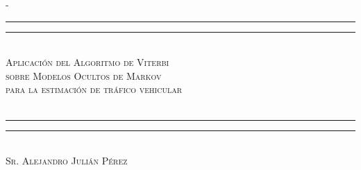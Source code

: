 %
%
% 
%
%
\begin{titlingpage}
\begin{SingleSpace}
\calccentering{\unitlength} 
\begin{adjustwidth*}{\unitlength}{-\unitlength}
\vspace*{13mm}
\begin{center}
\rule[0.5ex]{\linewidth}{2pt}\vspace*{-\baselineskip}\vspace*{3.2pt}
\rule[0.5ex]{\linewidth}{1pt}\\[\baselineskip]
{\large\textsc {Aplicación del Algoritmo de Viterbi \\ sobre Modelos Ocultos de Markov \\ para la estimación de tráfico vehicular } }\\[4mm]
{\Large \textit{}}\\
\rule[0.5ex]{\linewidth}{1pt}\vspace*{-\baselineskip}\vspace{3.2pt}
\rule[0.5ex]{\linewidth}{2pt}\\
\vspace{6.5mm}
\vspace{6.5mm}
{\large\textsc{Sr. Alejandro Julián Pérez}}\\
\vspace{11mm}

\end{center}
\end{adjustwidth*}
\end{SingleSpace}
\end{titlingpage}

